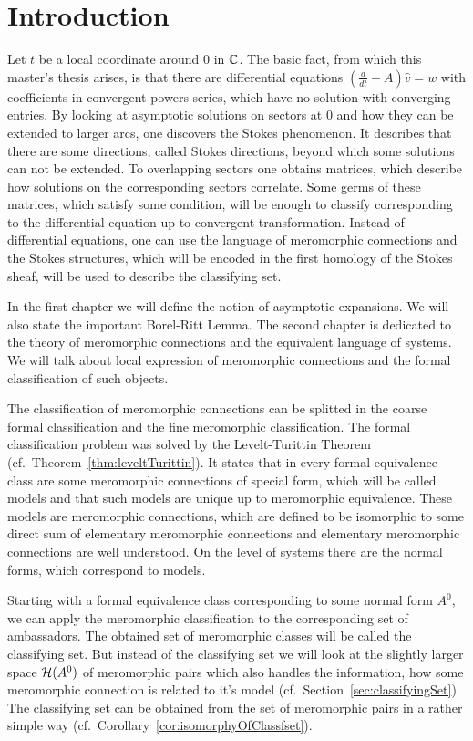 \chapter{Introduction}
Let $t$ be a local coordinate around $0$ in $\mathbb{C}$.
The basic fact, from which this master's thesis arises, is that there are
differential equations $(\frac{d}{dt}-A)\hat v=w$ with coefficients in
convergent powers series, which have no solution with converging entries.
By looking at asymptotic solutions on sectors at $0$ and how they can be extended to
larger arcs, one discovers the Stokes phenomenon. It describes that there are
some directions, called Stokes directions, beyond which some solutions can not
be extended.
To overlapping sectors one obtains matrices, which describe how solutions on the
corresponding sectors correlate.
Some germs of these matrices, which satisfy some condition, will be enough to
classify corresponding to the differential equation up to convergent
transformation.
Instead of differential equations, one can use the language of meromorphic
connections and the Stokes structures, which will be encoded in the first
homology of the Stokes sheaf, will be used to describe the classifying set.

In the first chapter we will define the notion of asymptotic expansions. We will
also state the important Borel-Ritt Lemma.
The second chapter is dedicated to the theory of meromorphic connections and the
equivalent language of systems. We will talk about local expression of
meromorphic connections and the formal classification of such objects.

The classification of meromorphic connections can be splitted in the coarse
formal classification and the fine meromorphic classification.
The formal classification problem was solved by the Levelt-Turittin Theorem
(cf.\ Theorem~\ref{thm:leveltTurittin}). It states that in every formal
equivalence class are some meromorphic connections of special form, which will
be called models and that such models are unique up to meromorphic equivalence.
These models are meromorphic connections, which are defined to be isomorphic to
some direct sum of elementary meromorphic connections and elementary
meromorphic connections are well understood.
On the level of systems there are the normal forms, which correspond to models.

Starting with a formal equivalence class corresponding to some normal form
$A^0$, we can apply the meromorphic classification to the corresponding set of
ambassadors.
The obtained set of meromorphic classes will be called the classifying set. But
instead of the classifying set we will look at the slightly larger space
$\mathcal{H}(A^0)$ of meromorphic pairs which also handles the information, how some
meromorphic connection is related to it's model
(cf.\ Section~\ref{sec:classifyingSet}).
The classifying set can be obtained from the set of meromorphic pairs in a
rather simple way (cf.\ Corollary~\ref{cor:isomorphyOfClassfset}).

